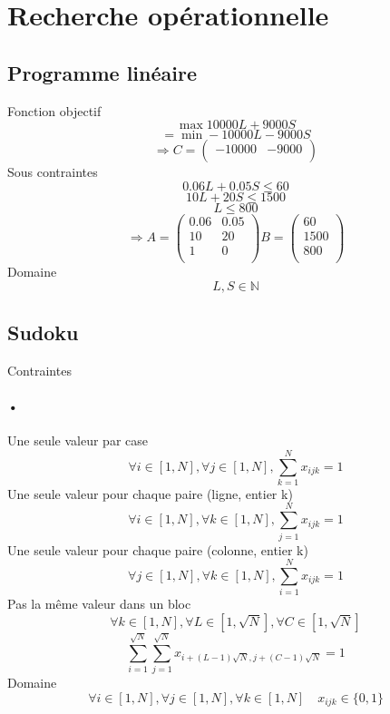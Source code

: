 \documentclass[12pt, a4paper]{report}
\author{Morgane Cadeau}
\begin{document}
\section*{Recherche op\'erationnelle}
\subsection*{Programme lin\'eaire}

\quad Fonction objectif
\[\max 10000L + 9000S\]
\[= \min -10000L - 9000S\]
\[
\Rightarrow C = \begin{pmatrix}
-10000&-9000 \\
\end{pmatrix}
\]
\quad Sous contraintes
\[0.06L + 0.05S \leq 60\]
\[10L + 20S \leq 1500\]
\[L \leq 800\]
\[
\Rightarrow A = \begin{pmatrix}
0.06 & 0.05 \\
10 & 20 \\
1 & 0 \\
\end{pmatrix}
B = \begin{pmatrix}
60 \\
1500 \\
800 \\
\end{pmatrix}
\]
\quad Domaine
\[L, S \in \mathbb{N}\] 

\subsection*{Sudoku}
\quad Contraintes
\paragraph{•}
\quad\quad Une seule valeur par case
\[\forall i \in [1, N], \forall j \in [1, N], \sum\limits_{k=1}^N x_{ijk} = 1\]
\quad\quad\quad Une seule valeur pour chaque paire (ligne, entier k)
\[\forall i \in [1, N], \forall k \in [1, N], \sum\limits_{j=1}^N x_{ijk} = 1\]
\quad\quad\quad Une seule valeur pour chaque paire (colonne, entier k)
\[\forall j \in [1, N], \forall k \in [1, N], \sum\limits_{i=1}^N x_{ijk} = 1\]
\quad\quad\quad Pas la m\^eme valeur dans un bloc
\[\forall k \in [1, N], \forall L \in [1, \sqrt{N}],\forall C \in [1, \sqrt{N}] \]
\[\sum\limits_{i=1}^{\sqrt{N}} \sum\limits_{j=1}^{\sqrt{N}} x_{i+(L-1)\sqrt{N}, j+(C-1)\sqrt{N}} = 1\]
\quad Domaine
\[\forall i \in [1, N], \forall j \in [1, N], \forall k \in [1, N] \quad x_{ijk} \in \{0, 1\}\] 
\end{document}
